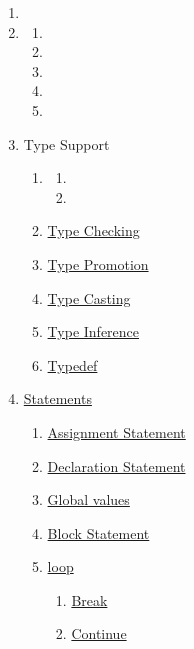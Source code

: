 \documentclass{article}
\begin{document}
  \begin{enumerate}[label*=\arabic*]
    \item {}
    \item {}
    \begin{enumerate}[label*=.\arabic*]
      \item {}
      \item {}
      \item {}
      \item {}
      \item {}
    \end{enumerate}
    \item Type Support
    \begin{enumerate}[label*=.\arabic*]
      \item {}
      \begin{enumerate}[label*=.\arabic*]
        \item {}
        \item {}
      \end{enumerate}
      \item \hyperref[sec:typeChecking]{Type Checking}
      \item \hyperref[sec:typePromotion]{Type Promotion}
      \item \hyperref[sec:typeCasting]{Type Casting}
      \item \hyperref[sec:typeInference]{Type Inference}
      \item \hyperref[sec:typedef]{Typedef}
    \end{enumerate}
    \item \hyperref[sec:statements]{Statements}
    \begin{enumerate}[label*=.\arabic*]
      \item \hyperref[sec:assignment]{Assignment Statement}
      \item \hyperref[sec:declaration]{Declaration Statement}
      \item \hyperref[sec:global]{Global values}
      \item \hyperref[sec:block]{Block Statement}
      \item \hyperref[sec:loop]{loop}
      \begin{enumerate}[label*=.\arabic*]
        \item \hyperref[sec:break]{Break}
        \item \hyperref[sec:continue]{Continue}

\end{enumerate}
\end{enumerate}
\end{enumerate}
\end{document}
